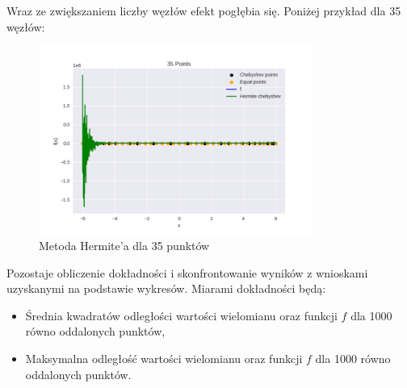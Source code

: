 \documentclass{article}
\begin{document}
Wraz ze zwiększaniem liczby węzłów efekt pogłębia się. Poniżej przykład dla 35 węzłów:

\begin{figure}[H]
    \centering
    \includegraphics[width=0.8\textwidth]{img/herm_35.png}
    \caption{Metoda Hermite'a dla 35 punktów}
\end{figure}

\newpage
Pozostaje obliczenie dokładności i skonfrontowanie wyników z wnioskami uzyskanymi na podstawie wykresów. Miarami dokładności będą:
\begin{itemize}
    \item
    Średnia kwadratów odległości wartości wielomianu oraz funkcji $f$ dla 1000 równo oddalonych punktów,
    \item
    Maksymalna odległość wartości wielomianu oraz funkcji $f$ dla 1000 równo oddalonych punktów.
\end{itemize}
\end{document}
